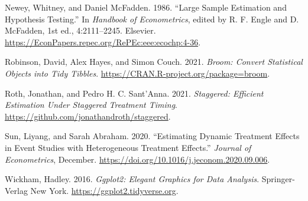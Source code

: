 \begin{CSLReferences}{1}{0}
\leavevmode{}%
Newey, Whitney, and Daniel McFadden. 1986. {``Large Sample Estimation and Hypothesis Testing.''} In \emph{Handbook of Econometrics}, edited by R. F. Engle and D. McFadden, 1st ed., 4:2111--2245. Elsevier. \url{https://EconPapers.repec.org/RePEc:eee:ecochp:4-36}.

\leavevmode{}%
Robinson, David, Alex Hayes, and Simon Couch. 2021. \emph{Broom: Convert Statistical Objects into Tidy Tibbles}. \url{https://CRAN.R-project.org/package=broom}.

\leavevmode{}%
Roth, Jonathan, and Pedro H. C. Sant'Anna. 2021. \emph{Staggered: Efficient Estimation Under Staggered Treatment Timing}. \url{https://github.com/jonathandroth/staggered}.

\leavevmode{}%
Sun, Liyang, and Sarah Abraham. 2020. {``Estimating Dynamic Treatment Effects in Event Studies with Heterogeneous Treatment Effects.''} \emph{Journal of Econometrics}, December. \url{https://doi.org/10.1016/j.jeconom.2020.09.006}.

\leavevmode{}%
Wickham, Hadley. 2016. \emph{Ggplot2: Elegant Graphics for Data Analysis}. Springer-Verlag New York. \url{https://ggplot2.tidyverse.org}.

\end{CSLReferences}



\address{%
Kyle Butts\\
University of Colorado Boulder\\%
\\
%
\url{https://www.kylebutts.com/}\\%
\textit{ORCiD: \href{https://orcid.org/0000-0002-9048-8059}{0000-0002-9048-8059}}\\%
\href{mailto:buttskyle96@gmail.com}{\nolinkurl{buttskyle96@gmail.com}}%
}

\address{%
John Gardner\\
University of Mississippi\\%
\\
%
\url{https://jrgcmu.github.io/}\\%
%
\href{mailto:jrgardne@olemiss.edu}{\nolinkurl{jrgardne@olemiss.edu}}%
}
